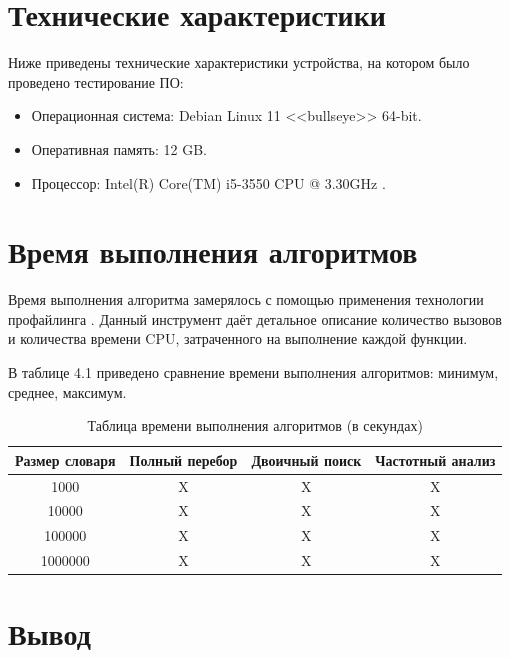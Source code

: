 \documentclass[12pt]{report}
\begin{document}
	
\section{Технические характеристики}
	
Ниже приведены технические характеристики устройства, на котором было проведено тестирование ПО:
	
\begin{itemize}
	\item Операционная система: Debian \cite{debian} Linux \cite{linux} 11 <<bullseye>> 64-bit.
	\item Оперативная память: 12 GB.
	\item Процессор: Intel(R) Core(TM) i5-3550 CPU @ 3.30GHz \cite{i5}.	
\end{itemize}
	
\section{Время выполнения алгоритмов}
	
Время выполнения алгоритма замерялось с помощью применения технологии профайлинга \cite{profiling}. Данный инструмент даёт детальное описание количество вызовов и количества времени CPU, затраченного на выполнение каждой функции.

В таблице 4.1 приведено сравнение времени выполнения алгоритмов: минимум, среднее, максимум.

\begin{table} [H]
		\caption{Таблица времени выполнения алгоритмов (в секундах)}
		\begin{center}
			\begin{tabular}{|c c c c |} 
				\hline
				Размер словаря & Полный перебор & Двоичный поиск & Частотный анализ  \\  
				\hline
				1000 & X & X & X  \\
				\hline
				10000 & X & X & X \\
				\hline
				100000 & X & X & X \\
				\hline
				1000000 & X & X & X  \\
				\hline
			\end{tabular}
		\end{center}
\end{table}
	
\section*{Вывод}
	
\end{document}
